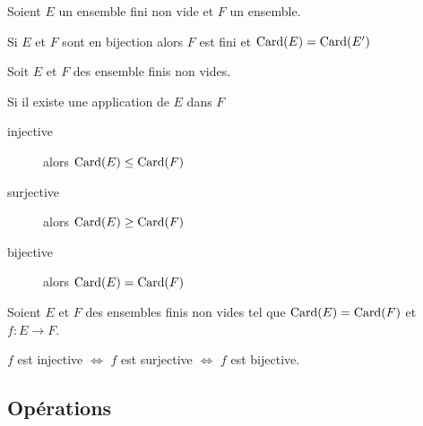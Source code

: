 \begin{prp}
  Soient $E$ un ensemble fini non vide et $F$ un ensemble.

  Si $E$ et $F$ sont en bijection alors $F$ est fini et
  $\operatorname{\mathrm{Card}}(E) = \operatorname{\mathrm{Card}}(E')$
\end{prp}

\begin{prp}
  Soit $E$ et $F$ des ensemble finis non vides.

  Si il existe une application de $E$ dans $F$
  \begin{description}
    \item[injective] alors $\operatorname{\mathrm{Card}}(E) \leq \operatorname{\mathrm{Card}}(F)$
    \item[surjective] alors $\operatorname{\mathrm{Card}}(E) \geq \operatorname{\mathrm{Card}}(F)$
    \item[bijective] alors $\operatorname{\mathrm{Card}}(E) = \operatorname{\mathrm{Card}}(F)$
  \end{description}
\end{prp}

\begin{prp}
  Soient $E$ et $F$ des ensembles finis non vides tel que $\operatorname{\mathrm{Card}}(E) = \operatorname{\mathrm{Card}}(F)$
  et $f : E \to F$.

  $f$ est injective $\iff$ $f$ est surjective $\iff$ $f$ est bijective.
\end{prp}

\subsection{Opérations}


